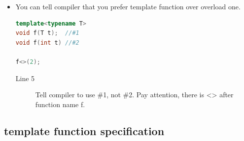 \documentclass[a4paper,11pt,twoside]{book}
\begin{document}
\begin{itemize}
\item You can tell compiler that you prefer template function over overload one.

\begin{lstlisting}[frame=single, language=c++]
template<typename T>
void f(T t);  //#1
void f(int t) //#2

f<>(2); 
\end{lstlisting}
\begin{description}
	\item[Line 5] Tell compiler to use \#1, not \#2. Pay attention, there is <> after function name f.
\end{description}

\end{itemize}



\subsection{template function specification}
\end{document}
